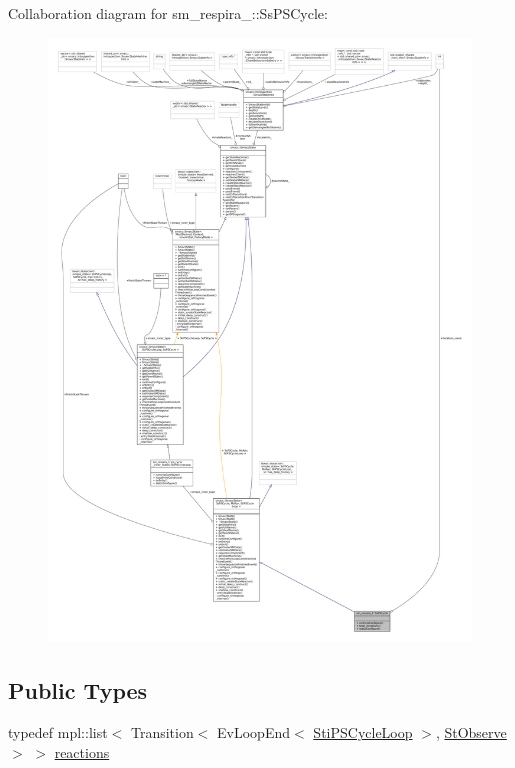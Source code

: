 Collaboration diagram for sm\+\_\+respira\+\_\+:\+:Ss\+P\+S\+Cycle\+:
\nopagebreak
\begin{figure}[H]
\begin{center}
\leavevmode
\includegraphics[width=350pt]{structsm__respira__1_1_1SsPSCycle__coll__graph}
\end{center}
\end{figure}
\subsection*{Public Types}
\begin{DoxyCompactItemize}
\item 
typedef mpl\+::list$<$ Transition$<$ Ev\+Loop\+End$<$ \hyperlink{structsm__respira__1_1_1ps__cycle__inner__states_1_1StiPSCycleLoop}{Sti\+P\+S\+Cycle\+Loop} $>$, \hyperlink{structsm__respira__1_1_1StObserve}{St\+Observe} $>$ $>$ \hyperlink{structsm__respira__1_1_1SsPSCycle_a7f7ede446472e94d9e483f4031ee8c0a}{reactions}
\end{DoxyCompactItemize}

